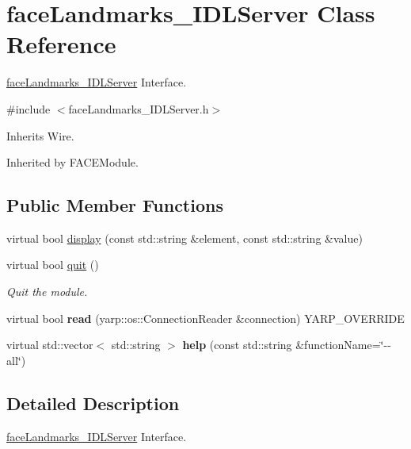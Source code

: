 \section{face\+Landmarks\+\_\+\+I\+D\+L\+Server Class Reference}
\label{classfaceLandmarks__IDLServer}


\mbox{\hyperlink{classfaceLandmarks__IDLServer}{face\+Landmarks\+\_\+\+I\+D\+L\+Server}} Interface.  




{\ttfamily \#include $<$face\+Landmarks\+\_\+\+I\+D\+L\+Server.\+h$>$}



Inherits Wire.



Inherited by F\+A\+C\+E\+Module.

\subsection*{Public Member Functions}
\begin{DoxyCompactItemize}
\item 
virtual bool \mbox{\hyperlink{classfaceLandmarks__IDLServer_a934f57ae7521327fe9e3dcc15aa4324a}{display}} (const std\+::string \&element, const std\+::string \&value)
\item 
virtual bool \mbox{\hyperlink{classfaceLandmarks__IDLServer_a545407b4071a1a8a3392881194dd1a56}{quit}} ()
\begin{DoxyCompactList}\small\item\em Quit the module. \end{DoxyCompactList}\item 
\mbox{\label{classfaceLandmarks__IDLServer_ade7e4da491c388dc5df623b543158d67}} 
virtual bool {\bfseries read} (yarp\+::os\+::\+Connection\+Reader \&connection) Y\+A\+R\+P\+\_\+\+O\+V\+E\+R\+R\+I\+DE
\item 
\mbox{\label{classfaceLandmarks__IDLServer_a2fd82dc219f996b065de76c634000334}} 
virtual std\+::vector$<$ std\+::string $>$ {\bfseries help} (const std\+::string \&function\+Name=\char`\"{}-\/-\/all\char`\"{})
\end{DoxyCompactItemize}


\subsection{Detailed Description}
\mbox{\hyperlink{classfaceLandmarks__IDLServer}{face\+Landmarks\+\_\+\+I\+D\+L\+Server}} Interface. 

